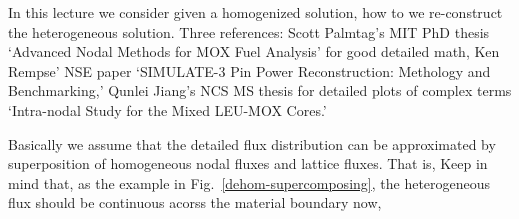 \documentclass{school-22.211-notes}
\date{May  9, 2012}
\begin{document}
\maketitle

In this lecture we consider given a homogenized solution, how to we re-construct the heterogeneous solution. Three references: Scott Palmtag's MIT PhD thesis `Advanced Nodal Methods for MOX Fuel Analysis' for good detailed math, Ken Rempse' NSE paper `SIMULATE-3 Pin Power Reconstruction: Methology and Benchmarking,' Qunlei Jiang's NCS MS thesis for detailed plots of complex terms `Intra-nodal Study for the Mixed LEU-MOX Cores.' 

Basically we assume that the detailed flux distribution can be approximated by superposition of homogeneous nodal fluxes and lattice fluxes. That is, 
Keep in mind that, as the example in Fig.~\ref{dehom-supercomposing}, the heterogeneous flux should be continuous acorss the material boundary now, 
\end{document}
